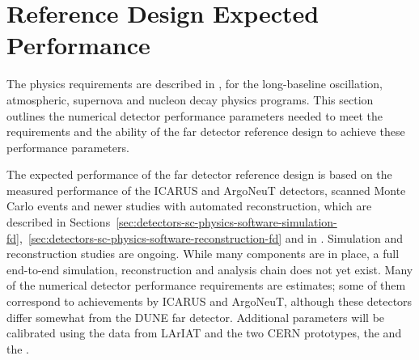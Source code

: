 
\section{Reference Design Expected Performance}
\label{sec:detectors-fd-ref-perf}

The physics requirements are described in \volphys,
for the long-baseline oscillation, atmospheric, supernova
and nucleon decay physics programs.  This section outlines the
numerical detector performance parameters needed to meet the
requirements and the ability of the far detector reference design
to achieve these performance parameters.  

The expected performance of the far detector reference design is based
on the measured performance of the ICARUS\cite{Amerio:2004ze} and
ArgoNeuT\cite{Anderson:2012vc} detectors, scanned Monte Carlo
events\cite{docdb-6954} and newer studies with automated
reconstruction, which are described in
Sections~\ref{sec:detectors-sc-physics-software-simulation-fd},~\ref{sec:detectors-sc-physics-software-reconstruction-fd}
and in \anxreco.  Simulation and reconstruction studies are ongoing.
While many components are in place, a full end-to-end simulation,
reconstruction and analysis chain does not yet exist. Many of the
numerical detector performance requirements are estimates; some of
them correspond to achievements by ICARUS and ArgoNeuT, although these
detectors differ somewhat from the DUNE far detector.  Additional
parameters will be calibrated using the data from LArIAT and the two
CERN prototypes, the \cernsingleproto{} and the \cerndualproto.

